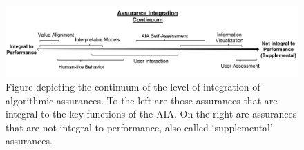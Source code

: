 \begin{figure}[!t]%
    \centering
    \includegraphics[width=1.0\textwidth]{Figures/Assurance_Integration.pdf}
    \caption{Figure depicting the continuum of the level of integration of algorithmic assurances. To the left are those assurances that are integral to the key functions of the AIA. On the right are assurances that are not integral to performance, also called `supplemental' assurances.}
    \label{fig:assurance_continuum}
\end{figure}









